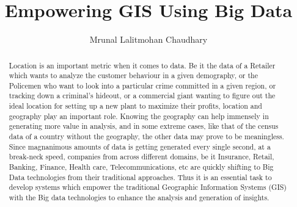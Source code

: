 \title{Empowering GIS Using Big Data}

\author{Mrunal Lalitmohan Chaudhary}




\begin{abstract}
Location is an important metric when it comes to data. Be it the data of a Retailer which wants to analyze the customer behaviour in a given demography, or the Policemen who want to look into a particular crime committed in a given region, or tracking down a criminal's hideout, or a commercial giant wanting to figure out the ideal location for setting up a new plant to maximize their profits, location and geography play an important role. Knowing the geography can help immensely in generating more value in analysis, and in some extreme cases, like that of the census data of a country without the geography, the other data may prove to be meaningless. Since magnanimous amounts of data is getting generated every single second, at a break-neck speed, companies from across different domains, be it Insurance, Retail, Banking, Finance, Health care, Telecommunications, etc are quickly shifting to Big Data technologies from their traditional approaches. Thus it is an essential task to develop systems which empower the traditional Geographic Information Systems (GIS) with the Big data technologies to enhance the analysis and generation of insights.
\end{abstract}



\maketitle



